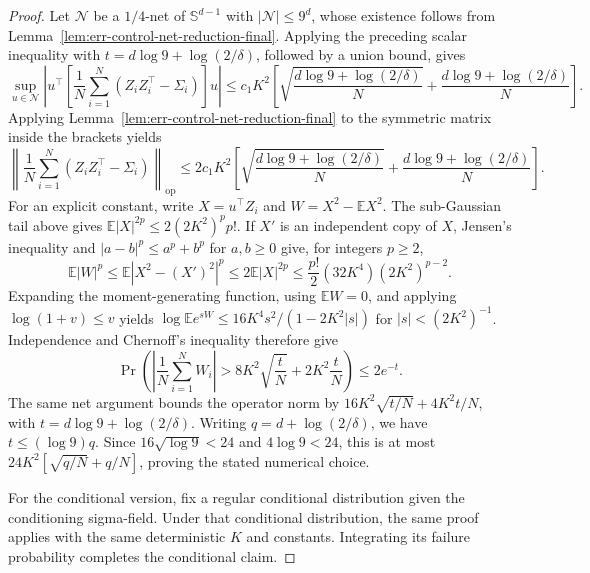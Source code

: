 \documentclass{article} %
\begin{document}
\begin{proof}
Let \(\mathcal{N}\) be a \(1/4\)-net of \(\mathbb{S}^{d-1}\) with
\(|\mathcal{N}|\le 9^d\), whose existence follows from
Lemma~\ref{lem:err-control-net-reduction-final}.  Applying the preceding scalar
inequality with \(t=d\log9+\log(2/\delta)\), followed by a union bound, gives
\begin{equation}
\sup_{u\in\mathcal{N}}
\left|
u^\top
\left[
\frac1N\sum_{i=1}^N
\left(Z_iZ_i^\top-\Sigma_i\right)
\right]
u
\right|
\leq
c_1K^2
\left[
\sqrt{\frac{d\log 9+\log(2/\delta)}{N}}
+
\frac{d\log 9+\log(2/\delta)}{N}
\right].
\end{equation}
Applying Lemma~\ref{lem:err-control-net-reduction-final} to the symmetric matrix
inside the brackets yields
\begin{equation}
\left\|
\frac1N\sum_{i=1}^N
\left(Z_iZ_i^\top-\Sigma_i\right)
\right\|_{\mathrm{op}}
\leq
2c_1K^2
\left[
\sqrt{\frac{d\log 9+\log(2/\delta)}{N}}
+
\frac{d\log 9+\log(2/\delta)}{N}
\right].
\end{equation}
For an explicit constant, write \(X=u^\top Z_i\) and
\(W=X^2-\mathbb E X^2\). The sub-Gaussian tail above gives
\(\mathbb E|X|^{2p}\leq2(2K^2)^p p!\).
If \(X'\) is an independent copy of \(X\), Jensen's inequality and
\(|a-b|^p\leq a^p+b^p\) for \(a,b\geq0\) give, for integers \(p\geq2\),
\begin{equation}
\mathbb E|W|^p
\leq \mathbb E|X^2-(X')^2|^p
\leq 2\mathbb E|X|^{2p}
\leq \frac{p!}{2}(32K^4)(2K^2)^{p-2}.
\end{equation}
Expanding the moment-generating function, using \(\mathbb E W=0\), and
applying \(\log(1+v)\leq v\) yields
\(\log\mathbb E e^{sW}\leq16K^4s^2/(1-2K^2|s|)\) for
\(|s|<(2K^2)^{-1}\). Independence and Chernoff's inequality therefore give
\begin{equation}
\Pr\!\left(
\left|\frac1N\sum_{i=1}^N W_i\right|
>8K^2\sqrt{\frac{t}{N}}+2K^2\frac{t}{N}
\right)\leq2e^{-t}.
\end{equation}
The same net argument bounds the operator norm by
\(16K^2\sqrt{t/N}+4K^2t/N\), with
\(t=d\log9+\log(2/\delta)\).
Writing \(q=d+\log(2/\delta)\), we have \(t\leq(\log9)q\).
Since \(16\sqrt{\log9}<24\) and \(4\log9<24\), this is at most
\(24K^2[\sqrt{q/N}+q/N]\), proving the stated numerical choice.

For the conditional version, fix a regular conditional distribution given the
conditioning sigma-field.  Under that conditional distribution, the same proof
applies with the same deterministic \(K\) and constants. Integrating its
failure probability completes the conditional claim.
\end{proof}
\end{document}
